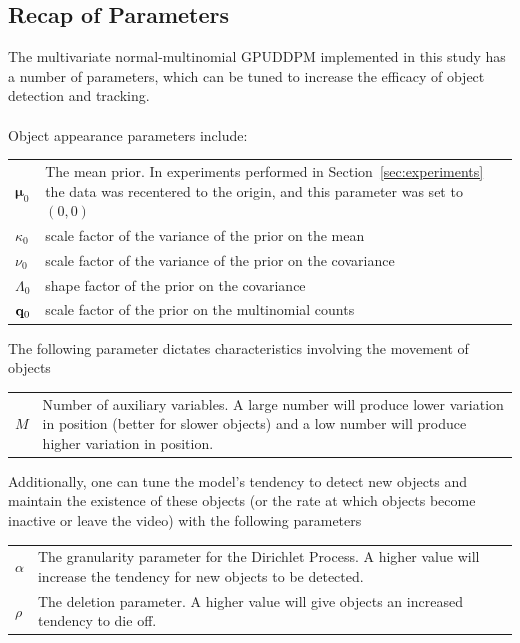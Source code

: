 \documentclass[twocolumn, final]{svjour3}
\begin{document}






\subsection{Recap of Parameters}
\label{sec:parameter_recap}

The multivariate normal-multinomial GPUDDPM implemented in this study has a number of parameters, which can be tuned to increase the efficacy of object detection and tracking. \\ \\
Object appearance parameters include:
\begin{center}
\begin{tabular}[c]{l p{10cm}}
$\boldsymbol{\mu}_{0}$  &  The mean prior. In experiments performed in Section~\ref{sec:experiments} the data was recentered to the origin, and this parameter was set to $(0,0)$ \\
$\kappa_{0}$  &  scale factor of the variance of the prior on the mean\\
$\nu_{0}$  &  scale factor of the variance of the prior on the covariance\\
$\Lambda_{0}$  &  shape factor of the prior on the covariance\\
$\bold{q}_{0}$  &  scale factor of the prior on the multinomial counts
\end{tabular}
\end{center} \vspace{3mm}
The following parameter dictates characteristics involving the movement of objects
\begin{center}
\begin{tabular}[c]{l p{10cm}}
$M$  &  Number of auxiliary variables. A large number will produce lower variation in position (better for slower objects) and a low number will produce higher variation in position.
\end{tabular}
\end{center} \vspace{3mm}
Additionally, one can tune the model's tendency to detect new objects and maintain the existence of these objects (or the rate at which objects become inactive or leave the video) with the following parameters
\begin{center}
\begin{tabular}[c]{l p{10cm}}
$\alpha$  &  The granularity parameter for the Dirichlet Process. A higher value will increase the tendency for new objects to be detected.\\
$\rho$  &  The deletion parameter. A higher value will give objects an increased tendency to die off.
\end{tabular}
\end{center}
\end{document}
